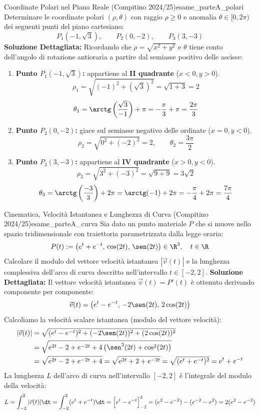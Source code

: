 \begin{esempio}{Coordinate Polari nel Piano Reale (Compitino 2024/25)}{esame_parteA_polari}
Determinare le coordinate polari $(\rho, \theta)$ con raggio $\rho \ge 0$ e anomalia $\theta \in [0, 2\pi)$ dei seguenti punti del piano cartesiano:
\[
    P_1(-1, \sqrt{3}), \qquad P_2(0, -2), \qquad P_3(3, -3)
\]
\tcblower
\textbf{Soluzione Dettagliata:}
Ricordando che $\rho = \sqrt{x^2 + y^2}$ e $\theta$ tiene conto dell'angolo di rotazione antioraria a partire dal semiasse positivo delle ascisse:
\begin{enumerate}
    \item \textbf{Punto $P_1(-1, \sqrt{3})$:} appartiene al \textbf{II quadrante} ($x < 0, y > 0$).
    \[
        \rho_1 = \sqrt{(-1)^2 + (\sqrt{3})^2} = \sqrt{1 + 3} = 2
    \]
    \[
        \theta_1 = \arctg\left(\frac{\sqrt{3}}{-1}\right) + \pi = -\frac{\pi}{3} + \pi = \frac{2\pi}{3}
    \]
    \item \textbf{Punto $P_2(0, -2)$:} giace sul semiasse negativo delle ordinate ($x = 0, y < 0$).
    \[
        \rho_2 = \sqrt{0^2 + (-2)^2} = 2, \qquad \theta_2 = \frac{3\pi}{2}
    \]
    \item \textbf{Punto $P_3(3, -3)$:} appartiene al \textbf{IV quadrante} ($x > 0, y < 0$).
    \[
        \rho_3 = \sqrt{3^2 + (-3)^2} = \sqrt{9 + 9} = 3\sqrt{2}
    \]
    \[
        \theta_3 = \arctg\left(\frac{-3}{3}\right) + 2\pi = \arctg(-1) + 2\pi = -\frac{\pi}{4} + 2\pi = \frac{7\pi}{4}
    \]
\end{enumerate}
\end{esempio}

\begin{esempio}{Cinematica, Velocità Istantanea e Lunghezza di Curva (Compitino 2024/25)}{esame_parteA_curva}
Sia dato un punto materiale $P$ che si muove nello spazio tridimensionale con traiettoria parametrizzata dalla legge oraria:
\[
    P(t) := \left( e^t + e^{-t}, \, \cos(2t), \, \sen(2t) \right) \in \R^3, \quad t \in \R
\]
Calcolare il modulo del vettore velocità istantanea $|\vec{v}(t)|$ e la lunghezza complessiva dell'arco di curva descritto nell'intervallo $t \in [-2, 2]$.
\tcblower
\textbf{Soluzione Dettagliata:}
Il vettore velocità istantanea $\vec{v}(t) = P'(t)$ è ottenuto derivando componente per componente:
\[
    \vec{v}(t) = \left( e^t - e^{-t}, \, -2\sen(2t), \, 2\cos(2t) \right)
\]
Calcoliamo la velocità scalare istantanea (modulo del vettore velocità):
\begin{align*}
    |\vec{v}(t)| &= \sqrt{(e^t - e^{-t})^2 + (-2\sen(2t))^2 + (2\cos(2t))^2} \\
    &= \sqrt{e^{2t} - 2 + e^{-2t} + 4\left(\sen^2(2t) + \cos^2(2t)\right)} \\
    &= \sqrt{e^{2t} - 2 + e^{-2t} + 4} = \sqrt{e^{2t} + 2 + e^{-2t}} = \sqrt{(e^t + e^{-t})^2} = e^t + e^{-t}
\end{align*}
La lunghezza $L$ dell'arco di curva nell'intervallo $[-2, 2]$ è l'integrale del modulo della velocità:
\[
    L = \int_{-2}^2 |\vec{v}(t)|\dt = \int_{-2}^2 (e^t + e^{-t})\dt = \Big[ e^t - e^{-t} \Big]_{-2}^2 = (e^2 - e^{-2}) - (e^{-2} - e^2) = 2(e^2 - e^{-2})
\]
\end{esempio}

